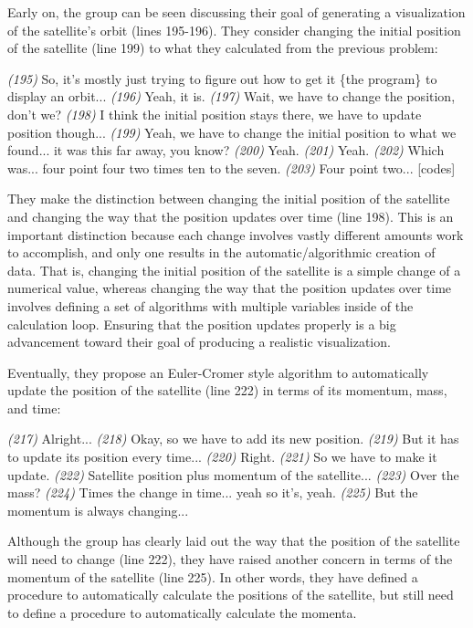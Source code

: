 \documentclass{msuphddissertation}
\begin{document}
\begin{doublespace}
Early on, the group can be seen discussing their goal of generating a visualization of the satellite's orbit (lines 195-196).  They consider changing the initial position of the satellite (line 199) to what they calculated from the previous problem:
\begin{description}		
\SD \textit{(195)} So, it's mostly just {trying} to figure out how to get it \{the program\} to display {an orbit}...
\SA \textit{(196)} Yeah, it is.	
\SC \textit{(197)} Wait, we have to change the position, don't we?	
\SB \textit{(198)} I think {the initial} position stays there, we have to update position though...
\SC \textit{(199)} Yeah, we have to change {the initial} position to what we found... it was this far away, you know?	
\SA \textit{(200)} Yeah.		
\SB \textit{(201)} Yeah.
\SA \textit{(202)} Which was... four point four two times ten to the seven.
\SB \textit{(203)} Four point two... [codes]
\end{description}  They make the distinction between changing the initial position of the satellite and changing the way that the position updates over time (line 198).  This is an important distinction because each change involves vastly different amounts work to accomplish, and only one results in the automatic/algorithmic creation of data.  That is, changing the initial position of the satellite is a simple change of a numerical value, whereas changing the way that the position updates over time involves defining a set of algorithms with multiple variables inside of the calculation loop.  Ensuring that the position updates properly is a big advancement toward their goal of producing a realistic visualization.

Eventually, they propose an Euler-Cromer style algorithm to automatically update the position of the satellite (line 222) in terms of its momentum, mass, and time:
\begin{description}
\SB \textit{(217)} Alright...
\SB \textit{(218)} Okay, so we have to add its {new} position.
\SA \textit{(219)} But it has to update its position every time...
\SB \textit{(220)} Right.
\SA \textit{(221)} So we have to make it update.
\SB \textit{(222)} Satellite position plus momentum of the satellite...
\SA \textit{(223)} Over the mass?			
\SB \textit{(224)} Times the change in time... yeah so it's, yeah.
\SB \textit{(225)} But the momentum is always changing...
\end{description}  Although the group has clearly laid out the way that the position of the satellite will need to change (line 222), they have raised another concern in terms of the momentum of the satellite (line 225).  In other words, they have defined a procedure to automatically calculate the positions of the satellite, but still need to define a procedure to automatically calculate the momenta.


\end{doublespace}
\end{document}
